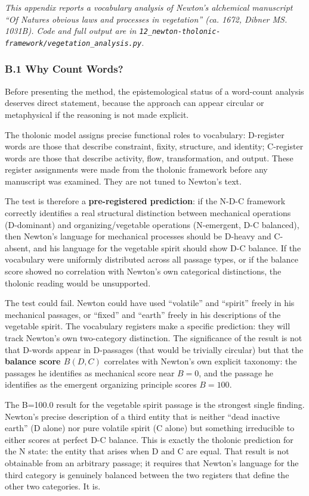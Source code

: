 \documentclass[12pt]{article}
\begin{document}
\emph{This appendix reports a vocabulary analysis of Newton's alchemical
manuscript ``Of Natures obvious laws and processes in vegetation'' (ca.
1672, Dibner MS. 1031B). Code and full output are in
\texttt{12\_newton-tholonic-framework/vegetation\_analysis.py}.}

\subsubsection{B.1 Why Count Words?}\label{b.1-why-count-words}

Before presenting the method, the epistemological status of a word-count
analysis deserves direct statement, because the approach can appear
circular or metaphysical if the reasoning is not made explicit.

The tholonic model assigns precise functional roles to vocabulary:
D-register words are those that describe constraint, fixity, structure,
and identity; C-register words are those that describe activity, flow,
transformation, and output. These register assignments were made from
the tholonic framework before any manuscript was examined. They are not
tuned to Newton's text.

The test is therefore a \textbf{pre-registered prediction}: if the N-D-C
framework correctly identifies a real structural distinction between
mechanical operations (D-dominant) and organizing/vegetable operations
(N-emergent, D-C balanced), then Newton's language for mechanical
processes should be D-heavy and C-absent, and his language for the
vegetable spirit should show D-C balance. If the vocabulary were
uniformly distributed across all passage types, or if the balance score
showed no correlation with Newton's own categorical distinctions, the
tholonic reading would be unsupported.

The test could fail. Newton could have used ``volatile'' and ``spirit''
freely in his mechanical passages, or ``fixed'' and ``earth'' freely in
his descriptions of the vegetable spirit. The vocabulary registers make
a specific prediction: they will track Newton's own two-category
distinction. The significance of the result is not that D-words appear
in D-passages (that would be trivially circular) but that the
\textbf{balance score \(B(D,C)\)} correlates with Newton's own explicit
taxonomy: the passages he identifies as mechanical score near \(B = 0\),
and the passage he identifies as the emergent organizing principle
scores \(B = 100\).

The B=100.0 result for the vegetable spirit passage is the strongest
single finding. Newton's precise description of a third entity that is
neither ``dead inactive earth'' (D alone) nor pure volatile spirit (C
alone) but something irreducible to either scores at perfect D-C
balance. This is exactly the tholonic prediction for the N state: the
entity that arises when D and C are equal. That result is not obtainable
from an arbitrary passage; it requires that Newton's language for the
third category is genuinely balanced between the two registers that
define the other two categories. It is.
\end{document}
